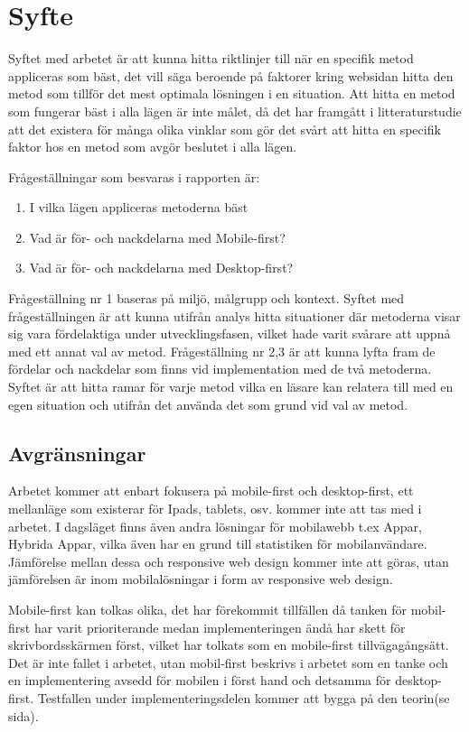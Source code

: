 \documentclass[11pt]{article}
\begin{document}
\section{Syfte}
Syftet med arbetet är att kunna hitta riktlinjer till när en specifik metod appliceras som bäst, det vill säga beroende på faktorer kring websidan hitta den metod som tillför det mest optimala lösningen i en situation. Att hitta en metod som fungerar bäst i alla lägen är inte målet, då det har framgått i litteraturstudie att det existera för många olika vinklar som gör det svårt att hitta en specifik faktor hos en metod som avgör beslutet i alla lägen.

Frågeställningar som besvaras i rapporten är:

\begin{enumerate}
	\item I vilka lägen appliceras metoderna bäst
	\item Vad är för- och nackdelarna med Mobile-first?
	\item Vad är för- och nackdelarna med Desktop-first?
\end{enumerate}

Frågeställning nr 1 baseras på miljö, målgrupp och kontext. Syftet med frågeställningen är att kunna utifrån analys hitta situationer där metoderna visar sig vara fördelaktiga under utvecklingsfasen, vilket hade varit svårare att uppnå med ett annat val av metod. Frågeställning nr 2,3 är att kunna lyfta fram de fördelar och nackdelar som finns vid implementation med de två metoderna. Syftet är att hitta ramar för varje metod vilka en läsare kan relatera till med en egen situation och utifrån det använda det som grund vid val av metod. 

\subsection{Avgränsningar}

Arbetet kommer att enbart fokusera på mobile-first och desktop-first, ett mellanläge som existerar för Ipads, tablets, osv. kommer inte att tas med i arbetet. I dagsläget finns även andra lösningar för mobilawebb t.ex Appar, Hybrida Appar, vilka även har en grund till statistiken för mobilanvändare. Jämförelse mellan dessa och responsive web design kommer inte att göras, utan jämförelsen är inom mobilalösningar i form av responsive web design.

Mobile-first kan tolkas olika, det har förekommit tillfällen då tanken för mobil-first har varit prioriterande medan implementeringen ändå har skett för skrivbordsskärmen först, vilket har tolkats som en mobile-first tillvägagångsätt.  Det är inte fallet i arbetet, utan mobil-first beskrivs i arbetet som en tanke och en implementering avsedd för mobilen i först hand och detsamma för desktop-first. Testfallen under implementeringsdelen kommer att bygga på den teorin(se sida).
\end{document}
